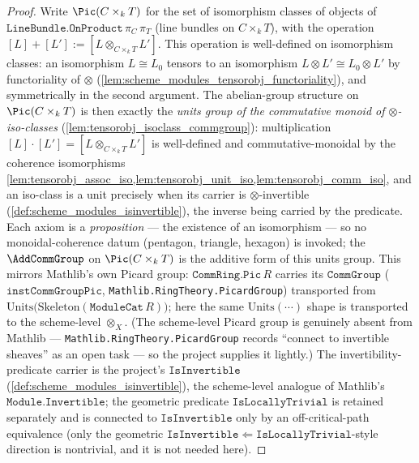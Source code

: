 \begin{proof}
  \leanok
  Write \(\Pic(C \times_k T)\) for the set of isomorphism classes of objects
  of \(\texttt{LineBundle.OnProduct}\,\pi_C\,\pi_T\) (line bundles on
  \(C \times_k T\)), with the operation
  \([L] + [L'] := [L \otimes_{C \times_k T} L']\). This operation is
  well-defined on isomorphism classes: an isomorphism \(L \cong L_0\) tensors
  to an isomorphism \(L \otimes L' \cong L_0 \otimes L'\) by functoriality of
  \(\otimes\) (\cref{lem:scheme_modules_tensorobj_functoriality}), and
  symmetrically in the second argument. The abelian-group structure on
  \(\Pic(C \times_k T)\) is then exactly the \emph{units group of the
  commutative monoid of \(\otimes\)-iso-classes}
  (\cref{lem:tensorobj_isoclass_commgroup}): multiplication
  \([L]\cdot[L'] = [L \otimes_{C\times_k T} L']\) is well-defined and
  commutative-monoidal by the coherence isomorphisms
  \cref{lem:tensorobj_assoc_iso,lem:tensorobj_unit_iso,lem:tensorobj_comm_iso},
  and an iso-class is a unit precisely when its carrier is
  \(\otimes\)-invertible (\cref{def:scheme_modules_isinvertible}), the inverse
  being carried by the predicate. Each axiom is a \emph{proposition} --- the
  existence of an isomorphism --- so no monoidal-coherence datum (pentagon,
  triangle, hexagon) is invoked; the \(\AddCommGroup\) on
  \(\Pic(C \times_k T)\) is the additive form of this units group. This mirrors
  Mathlib's own Picard group: \(\mathtt{CommRing.Pic}\,R\) carries its
  \(\mathtt{CommGroup}\) (\(\mathtt{instCommGroupPic}\),
  \texttt{Mathlib.RingTheory.PicardGroup}) transported from
  \(\mathrm{Units}\bigl(\mathrm{Skeleton}(\mathtt{ModuleCat}\,R)\bigr)\); here
  the same \(\mathrm{Units}(\cdots)\) shape is transported to the scheme-level
  \(\otimes_X\). (The scheme-level Picard group is genuinely absent from
  Mathlib --- \texttt{Mathlib.RingTheory.PicardGroup} records ``connect to
  invertible sheaves'' as an open task --- so the project supplies it lightly.)
  The invertibility-predicate carrier is the project's \(\mathtt{IsInvertible}\)
  (\cref{def:scheme_modules_isinvertible}), the scheme-level analogue of
  Mathlib's \(\mathtt{Module.Invertible}\); the geometric predicate
  \(\mathtt{IsLocallyTrivial}\) is retained separately and is connected to
  \(\mathtt{IsInvertible}\) only by an off-critical-path equivalence (only the
  geometric \(\mathtt{IsInvertible} \Leftarrow \mathtt{IsLocallyTrivial}\)-style
  direction is nontrivial, and it is not needed here).


\end{proof}
